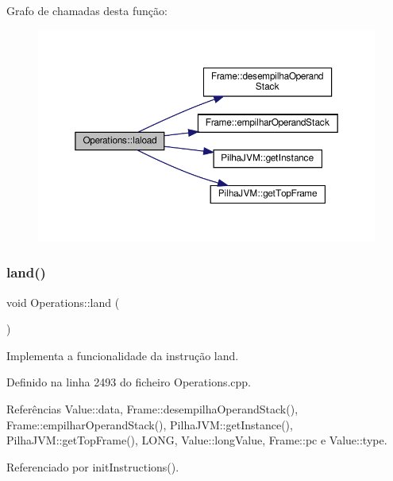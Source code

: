 Grafo de chamadas desta função\+:\nopagebreak
\begin{figure}[H]
\begin{center}
\leavevmode
\includegraphics[width=350pt]{classOperations_a064f10825e8f0153ef19d466845d3734_cgraph}
\end{center}
\end{figure}
\mbox{\label{classOperations_a6104d728be025abb71570139b988ed4e}} 
\subsubsection{\texorpdfstring{land()}{land()}}
{\footnotesize\ttfamily void Operations\+::land (\begin{DoxyParamCaption}{ }\end{DoxyParamCaption})\hspace{0.3cm}{\ttfamily [private]}}



Implementa a funcionalidade da instrução land. 



Definido na linha 2493 do ficheiro Operations.\+cpp.



Referências Value\+::data, Frame\+::desempilha\+Operand\+Stack(), Frame\+::empilhar\+Operand\+Stack(), Pilha\+J\+V\+M\+::get\+Instance(), Pilha\+J\+V\+M\+::get\+Top\+Frame(), L\+O\+NG, Value\+::long\+Value, Frame\+::pc e Value\+::type.



Referenciado por init\+Instructions().

